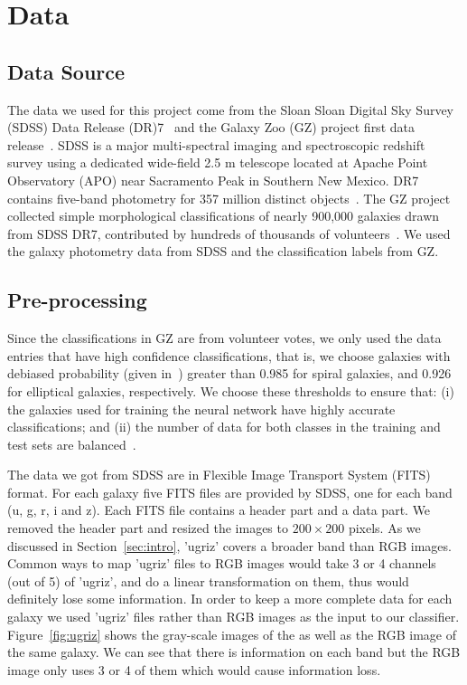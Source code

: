 \section{Data}
\label{sec:data}
\subsection{Data Source}
The data we used for this project come from the Sloan Sloan Digital Sky Survey (SDSS) Data Release (DR)7~\cite{abazajian2009seventh} and the Galaxy Zoo (GZ) project first data release~\cite{lintott2010galaxy}. SDSS is a major multi-spectral imaging and spectroscopic redshift survey using a dedicated wide-field 2.5 m telescope located at Apache Point Observatory (APO) near Sacramento Peak in Southern New Mexico.
DR7 contains five-band photometry for 357 million distinct objects~\cite{abazajian2009seventh}. The GZ project collected simple morphological classifications of nearly 900,000 galaxies drawn from SDSS DR7, contributed by hundreds of thousands of volunteers~\cite{lintott2010galaxy}. 
We used the galaxy photometry data from SDSS and the classification labels from GZ. 

\subsection{Pre-processing}
Since the classifications in GZ are from volunteer votes, we only used the data entries that
have high confidence classifications, that is, we choose galaxies with debiased probability (given in~\cite{lintott2010galaxy}) greater than 0.985 for spiral galaxies, and 0.926 for elliptical galaxies, respectively. We choose these thresholds to ensure that: (i) the galaxies used for training the neural network have highly accurate classifications; and (ii) the number of data for both classes in the training and test sets are balanced~\cite{khan2019deep}. 

The data we got from SDSS are in Flexible Image Transport System (FITS) format. For each galaxy five FITS files are provided by SDSS, one for each band (u, g, r, i and z). Each FITS file contains a header part and a data part. We removed the header part and resized the images to $200 \times 200$ pixels. As we discussed in Section~\ref{sec:intro}, 'ugriz' covers a broader band than RGB images. Common ways to map 'ugriz' files to RGB images would take 3 or 4 channels (out of 5) of 'ugriz', and do a linear transformation on them, thus would definitely lose some information. 
In order to keep a more complete data for each galaxy we used 'ugriz' files rather than RGB images as the input to our classifier. Figure~\ref{fig:ugriz} shows the gray-scale images of the  as well as the RGB image of the same galaxy. We can see that there is information on each band but the RGB image only uses 3 or 4 of them which would cause information loss.

